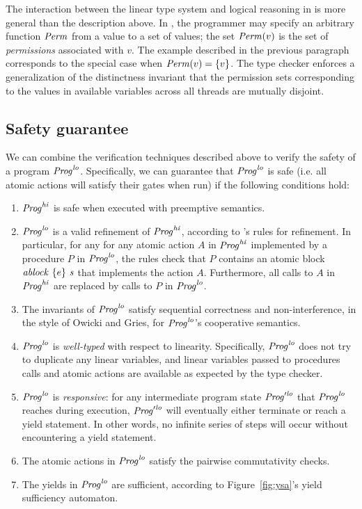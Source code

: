 The interaction between the linear type system and logical reasoning in \civl is more general than the description above.
In \civl, the programmer may specify an arbitrary function $\mathit{Perm}$ from a value to a set of values;
the set $\mathit{Perm}(v)$ is the set of {\em permissions\/} associated with $v$.
The example described in the previous paragraph corresponds to the special case when $\mathit{Perm}(v) = \{v\}$.
The \civl type checker enforces a generalization of the distinctness invariant that 
the permission sets corresponding to the values in available variables across all threads are mutually disjoint.

\subsection{Safety guarantee}

We can combine the verification techniques described above to verify the safety of a program $\mathit{Prog}^{\mathit{lo}}$.
Specifically, we can guarantee that $\mathit{Prog}^{\mathit{lo}}$ is safe (i.e. all atomic actions will satisfy their gates when run)
if the following conditions hold:

\begin{enumerate}
\item
$\mathit{Prog}^{\mathit{hi}}$ is safe when executed with preemptive semantics.
\item
$\mathit{Prog}^{\mathit{lo}}$ is a valid refinement of $\mathit{Prog}^{\mathit{hi}}$, according to \civl's rules for refinement.
In particular, for any for any atomic action $A$ in $\mathit{Prog}^{\mathit{hi}}$ implemented by a procedure $P$ in $\mathit{Prog}^{\mathit{lo}}$,
the rules check that $P$ contains an atomic block $\mathit{ablock}\ {\{e\}}\ {\mathit{s}}$ that implements the action $A$.
Furthermore, all calls to $A$ in $\mathit{Prog}^{\mathit{hi}}$ are replaced by calls to $P$ in $\mathit{Prog}^{\mathit{lo}}$.
\item
The invariants of $\mathit{Prog}^{\mathit{lo}}$ satisfy sequential correctness and non-interference,
in the style of Owicki and Gries,
for $\mathit{Prog}^{\mathit{lo}}$'s cooperative semantics.
\item
$\mathit{Prog}^{\mathit{lo}}$ is {\em well-typed} with respect to linearity.
Specifically, $\mathit{Prog}^{\mathit{lo}}$ does not try to duplicate any linear variables,
and linear variables passed to procedures calls and atomic actions are available
as expected by the type checker.
\item
$\mathit{Prog}^{\mathit{lo}}$ is {\em responsive}:
for any intermediate program state $\mathit{Prog}'^{\mathit{lo}}$ that $\mathit{Prog}^{\mathit{lo}}$ reaches during execution,
$\mathit{Prog}'^{\mathit{lo}}$ will eventually either terminate or reach a yield statement.
In other words, no infinite series of steps will occur without encountering a yield statement.
\item
The atomic actions in $\mathit{Prog}^{\mathit{lo}}$ satisfy the pairwise commutativity checks.
\item
The yields in $\mathit{Prog}^{\mathit{lo}}$ are sufficient, according to Figure~\ref{fig:ysa}'s yield sufficiency automaton.
\end{enumerate}

